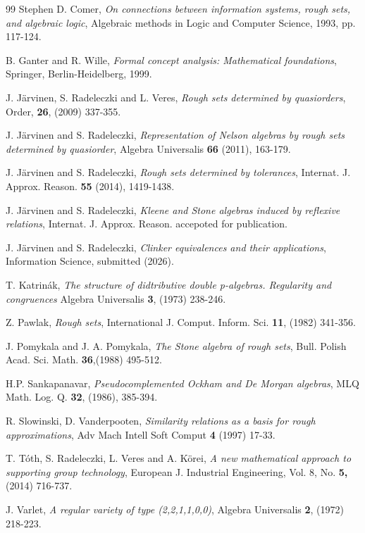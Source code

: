 \documentclass[a4paper]{article} %
\begin{document}
\begin{thebibliography}{99}                                                                                               %
\bibitem[1]{}Stephen D. Comer, \textit{ On connections between information
systems, rough sets, and algebraic logic}, Algebraic methods in Logic and
Computer Science, 1993, pp. 117-124.

\bibitem[2]{}B. Ganter and R. Wille, \textit{ Formal concept analysis:
Mathematical foundations}, Springer, Berlin-Heidelberg, 1999.

\bibitem[3]{}J. J\"{a}rvinen, S. Radeleczki and L. Veres,\textit{ Rough sets
determined by quasiorders}, Order, \textbf{26}, (2009) 337-355.

\bibitem[4]{}J. J\"{a}rvinen and S. Radeleczki, \textit{ Representation of
Nelson algebras by rough sets determined by quasiorder}, Algebra Universalis
\textbf{66} (2011), 163-179.

\bibitem[5]{}J. J\"{a}rvinen and S. Radeleczki, \textit{ Rough sets determined
by tolerances}, Internat. J. Approx. Reason. \textbf{55} (2014), 1419-1438.

\bibitem[6]{}J. J\"{a}rvinen and S. Radeleczki, \textit{Kleene and Stone
algebras induced by reflexive relations}, Internat. J. Approx. Reason.
accepoted for publication.

\bibitem[7]{}J. J\"{a}rvinen and S. Radeleczki, \textit{Clinker equivalences
and their applications}, Information Science, submitted (2026).

\bibitem[8]{}T. Katrin\'{a}k, \textit{ The structure of didtributive double
p-algebras. Regularity and congruences} Algebra Universalis \textbf{3}, (1973) 238-246.

\bibitem[9]{}Z. Pawlak,\textit{ Rough sets}, International J. Comput. Inform.
Sci. \textbf{11}, (1982) 341-356.

\bibitem[10]{}J. Pomykala and J. A. Pomykala,\textit{ The Stone algebra of
rough sets}, Bull. Polish Acad. Sci. Math. \textbf{36},(1988) 495-512.

\bibitem[11]{}H.P. Sankapanavar, \textit{ Pseudocomplemented Ockham and De
Morgan algebras}, MLQ Math. Log. Q. \textbf{32}, (1986), 385-394.

\bibitem[12]{}R. Slowinski, D. Vanderpooten, \textit{Similarity relations as a
basis for rough approximations}, Adv Mach Intell Soft Comput \textbf{4} (1997) 17-33.

\bibitem[13]{}T. T\'{o}th, S. Radeleczki, L. Veres and A. K\"{o}rei, \textit{A
new mathematical approach to supporting group technology}, European J.
Industrial Engineering, Vol. 8, No. \textbf{5,} (2014) 716-737.

\bibitem[14]{}J. Varlet, \textit{ A regular variety of type (2,2,1,1,0,0)},
Algebra Universalis \textbf{2}, (1972) 218-223.
\end{thebibliography}
\end{document}

